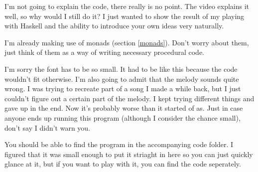 \documentclass[11pt]{article}
\begin{document}
I'm not going to explain the code, there really is no point. The video explains
it well, so why would I still do it? I just wanted to show the result of my
playing with Haskell and the ability to introduce your own ideas very
naturally.

I'm already making use of monads (section \ref{monads}). Don't worry about
them, just think of them as a way of writing necessary procedural code.

I'm sorry the font has to be so small. It had to be like this because the code
wouldn't fit otherwise. I'm also going to admit that the melody sounds quite
wrong. I was trying to recreate part of a song I made a while back, but I just
couldn't figure out a certain part of the melody. I kept trying different
things and gave up in the end. Now it's probably worse than it started of as.
Just in case anyone ends up running this program (although I consider the
chance small), don't say I didn't warn you.

You should be able to find the program in the accompanying code folder. I
figured that it was small enough to put it striaght in here so you can just
quickly glance at it, but if you want to play with it, you can find the code
seperately.
\end{document}
